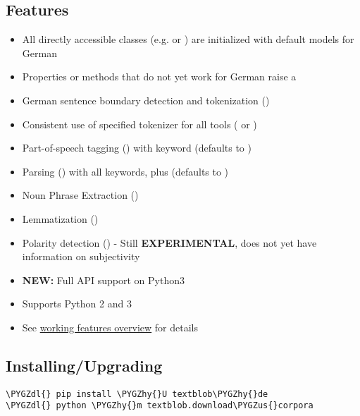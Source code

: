 \documentclass[letterpaper,10pt,english]{sphinxmanual}
\def\PYGZus{\char`\_}
\def\PYGZdl{\char`\$}
\def\PYGZhy{\char`\-}
\begin{document}
\subsection{Features}
\label{readme:features}\begin{itemize}
\item {} 
All directly accessible  classes (e.g.  or ) are initialized with default models for German

\item {} 
Properties or methods that do not yet work for German raise a 

\item {} 
German sentence boundary detection and tokenization ()

\item {} 
Consistent use of specified tokenizer for all tools ( or )

\item {} 
Part-of-speech tagging () with keyword  (defaults to )

\item {} 
Parsing () with all  keywords, plus  (defaults to )

\item {} 
Noun Phrase Extraction ()

\item {} 
Lemmatization ()

\item {} 
Polarity detection () - Still \textbf{EXPERIMENTAL}, does not yet have information on subjectivity

\item {} 
\textbf{NEW:} Full  API support on Python3

\item {} 
Supports Python 2 and 3

\item {} 
See \href{http://langui.ch/nlp/python/textblob-de/}{working features overview} for details

\end{itemize}


\subsection{Installing/Upgrading}
\label{readme:installing-upgrading}
\begin{Verbatim}[commandchars=\\\{\}]
\PYGZdl{} pip install \PYGZhy{}U textblob\PYGZhy{}de
\PYGZdl{} python \PYGZhy{}m textblob.download\PYGZus{}corpora
\end{Verbatim}
\end{document}
